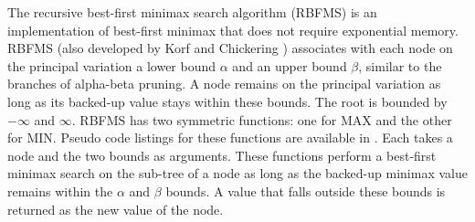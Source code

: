 The recursive best-first minimax search algorithm (RBFMS) is an implementation of best-first minimax that does not require exponential memory. RBFMS (also developed by Korf and Chickering \cite{korf:best}) associates with each node on the principal variation a lower bound $\alpha$ and an upper bound $\beta$, similar to the branches of alpha-beta pruning.  A node remains on the principal variation as long as its backed-up value stays within these bounds.  The root is bounded by $-\infty$ and $\infty$. RBFMS has two symmetric functions: one for MAX and the other for MIN.  Pseudo code listings for these functions are available in .  Each takes a node and the two bounds as arguments.  These functions perform a best-first minimax search on the sub-tree of a node as long as the backed-up minimax value remains within the $\alpha$ and $\beta$ bounds.  A value that falls outside these bounds is returned as the new value of the node.
